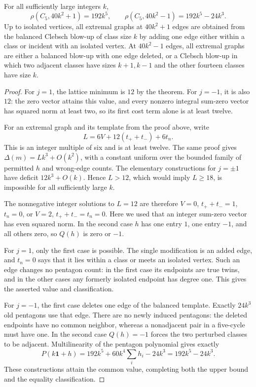 \begin{corollary}
\label{cor:two-exact-offsets}
For all sufficiently large integers $k$,
\[
 \rho(C_5,40k^2+1)=192k^5,\qquad
 \rho(C_5,40k^2-1)=192k^5-24k^3.
\]
Up to isolated vertices, all extremal graphs at $40k^2+1$ edges are
obtained from the balanced Clebsch blow-up of class size $k$ by adding
one edge either within a class or incident with an isolated vertex. At
$40k^2-1$ edges, all extremal graphs are either a balanced blow-up with
one edge deleted, or a Clebsch blow-up in which two adjacent classes
have sizes $k+1,k-1$ and the other fourteen classes have size $k$.
\end{corollary}
\begin{proof}
For $j=1$, the lattice minimum is $12$ by the theorem. For $j=-1$, it is
also $12$: the zero vector attains this value, and every nonzero integral
sum-zero vector has squared norm at least two, so its first cost term
alone is at least twelve.

For an extremal graph and its template from the proof above, write
\[
 L=6V+12(t_++t_-)+6t_n.
\]
This is an integer multiple of six and is at least twelve. The same
proof gives $\Delta(m)=Lk^3+O(k^2)$, with a constant uniform over the
bounded family of permitted $h$ and wrong-edge counts. The elementary
constructions for $j=\pm1$ have deficit $12k^3+O(k)$. Hence $L>12$,
which would imply $L\geq18$, is impossible for all sufficiently large
$k$.

The nonnegative integer solutions to $L=12$ are therefore
$V=0$, $t_++t_-=1$, $t_n=0$, or $V=2$, $t_++t_-=t_n=0$. Here we used
that an integer sum-zero vector has even squared norm. In the second
case $h$ has one entry $1$, one entry $-1$, and all others zero, so
$Q(h)$ is zero or $-1$.

For $j=1$, only the first case is possible. The single modification is
an added edge, and $t_n=0$ says that it lies within a class or meets an
isolated vertex. Such an edge changes no pentagon count: in the first
case its endpoints are true twins, and in the other cases any formerly
isolated endpoint has degree one. This gives the asserted value and
classification.

For $j=-1$, the first case deletes one edge of the balanced template.
Exactly $24k^3$ old pentagons use that edge. There are no newly induced
pentagons: the deleted endpoints have no common neighbor, whereas a
nonadjacent pair in a five-cycle must have one. In the second case
$Q(h)=-1$ forces the two perturbed classes to be adjacent.
Multilinearity of the pentagon polynomial gives exactly
\[
 P(k\mathbf1+h)=192k^5+60k^4\sum_i h_i-24k^3=192k^5-24k^3.
\]
These constructions attain the common value, completing both the upper
bound and the equality classification.
\end{proof}

